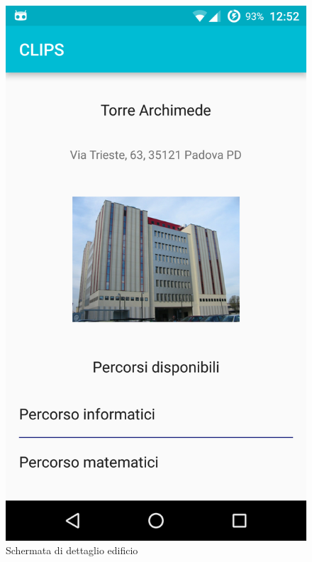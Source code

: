 \begin{figure}[!h]
	\centering
	\includegraphics[scale=0.15]{screenshot/edificio}
	\caption{Schermata di dettaglio edificio}
\end{figure}